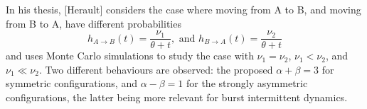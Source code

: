 \documentclass[10pt,a4paper]{article}
\begin{document}
  In his thesis, [Herault] considers the case where moving from A to B, and
  moving from B to A, have different probabilities
  \begin{equation}
    h_{A\to B}(t) = \frac{\nu_1}{\theta + t}, \mbox{ and }
    h_{B\to A}(t) = \frac{\nu_2}{\theta + t}
  \end{equation}
  and uses Monte Carlo simulations to study the case with $\nu_1=\nu_2$,
  $\nu_1<\nu_2$, and $\nu_1\ll\nu_2$. Two different behaviours are observed: the
  proposed $\alpha+\beta=3$ for symmetric configurations, and $\alpha-\beta=1$
  for the strongly asymmetric configurations, the latter being more relevant for
  burst intermittent dynamics.

\end{document}

